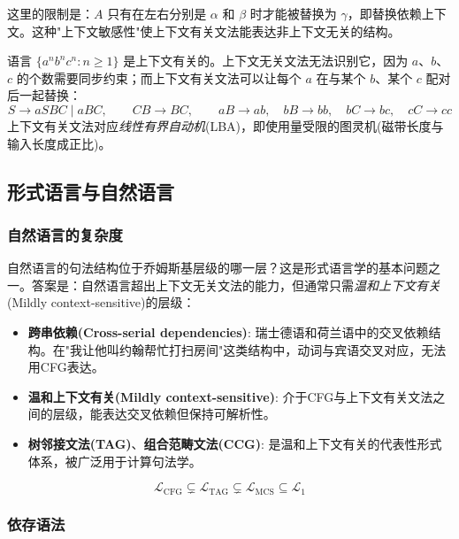 这里的限制是：$A$ 只有在左右分别是 $\alpha$ 和 $\beta$ 时才能被替换为 $\gamma$，即替换依赖上下文。这种"上下文敏感性"使上下文有关文法能表达非上下文无关的结构。

\begin{example}
语言 $\{a^n b^n c^n : n \geq 1\}$ 是上下文有关的。上下文无关文法无法识别它，因为 $a$、$b$、$c$ 的个数需要同步约束；而上下文有关文法可以让每个 $a$ 在与某个 $b$、某个 $c$ 配对后一起替换：
\begin{equation}
    S \rightarrow aSBC \mid aBC, \qquad CB \rightarrow BC, \qquad aB \rightarrow ab, \quad bB \rightarrow bb, \quad bC \rightarrow bc, \quad cC \rightarrow cc
\end{equation}
上下文有关文法对应\emph{线性有界自动机}(LBA)，即使用量受限的图灵机(磁带长度与输入长度成正比)。
\end{example}

\subsection{形式语言与自然语言}

\subsubsection{自然语言的复杂度}

自然语言的句法结构位于乔姆斯基层级的哪一层？这是形式语言学的基本问题之一。答案是：自然语言超出上下文无关文法的能力，但通常只需\emph{温和上下文有关}(Mildly context-sensitive)的层级：

\begin{itemize}
    \item \textbf{跨串依赖(Cross-serial dependencies)}: 瑞士德语和荷兰语中的交叉依赖结构。在"我让他叫约翰帮忙打扫房间"这类结构中，动词与宾语交叉对应，无法用CFG表达。
    \item \textbf{温和上下文有关(Mildly context-sensitive)}: 介于CFG与上下文有关文法之间的层级，能表达交叉依赖但保持可解析性。
    \item \textbf{树邻接文法(TAG)}、\textbf{组合范畴文法(CCG)}: 是温和上下文有关的代表性形式体系，被广泛用于计算句法学。
\end{itemize}

\begin{equation}
    \mathcal{L}_{\text{CFG}} \subsetneq \mathcal{L}_{\text{TAG}} \subsetneq \mathcal{L}_{\text{MCS}} \subseteq \mathcal{L}_1
\end{equation}

\subsubsection{依存语法}


